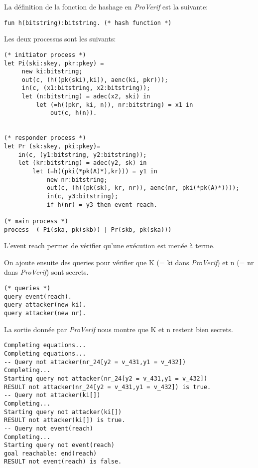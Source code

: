 \documentclass[10pt,a4paper]{article}
\begin{document}
La définition de la fonction de hashage en \textit{ProVerif} est la suivante:


\begin{Verbatim}[fontsize=\scriptsize]
fun h(bitstring):bitstring. (* hash function *)
\end{Verbatim}

Les deux processus sont les suivants:

\begin{Verbatim}[fontsize=\scriptsize]
(* initiator process *)
let Pi(ski:skey, pkr:pkey) = 
	 new ki:bitstring; 
	 out(c, (h((pk(ski),ki)), aenc(ki, pkr)));
	 in(c, (x1:bitstring, x2:bitstring));
	 let (n:bitstring) = adec(x2, ski) in
		 let (=h((pkr, ki, n)), nr:bitstring) = x1 in
			 out(c, h(n)).
	 

(* responder process *)
let Pr (sk:skey, pki:pkey)=
	in(c, (y1:bitstring, y2:bitstring));
	let (kr:bitstring) = adec(y2, sk) in
		let (=h((pki(*pk(A)*),kr))) = y1 in
			new nr:bitstring; 
			out(c, (h((pk(sk), kr, nr)), aenc(nr, pki(*pk(A)*))));
			in(c, y3:bitstring);
			if h(nr) = y3 then event reach.
			
(* main process *)
process  ( Pi(ska, pk(skb)) | Pr(skb, pk(ska)))
\end{Verbatim}


L'event reach permet de vérifier qu'une exécution est menée à terme.

On ajoute ensuite des queries pour vérifier que K (= ki dans \textit{ProVerif}) et n (= nr dans \textit{ProVerif}) sont secrets.

\begin{Verbatim}[fontsize=\scriptsize]
(* queries *)
query event(reach).
query attacker(new ki).
query attacker(new nr).
\end{Verbatim}

La sortie donnée par \textit{ProVerif} nous montre que K et n restent bien secrets.

\begin{Verbatim}[fontsize=\scriptsize]
Completing equations...
Completing equations...
-- Query not attacker(nr_24[y2 = v_431,y1 = v_432])
Completing...
Starting query not attacker(nr_24[y2 = v_431,y1 = v_432])
RESULT not attacker(nr_24[y2 = v_431,y1 = v_432]) is true.
-- Query not attacker(ki[])
Completing...
Starting query not attacker(ki[])
RESULT not attacker(ki[]) is true.
-- Query not event(reach)
Completing...
Starting query not event(reach)
goal reachable: end(reach)
RESULT not event(reach) is false.
\end{Verbatim}
\end{document}
